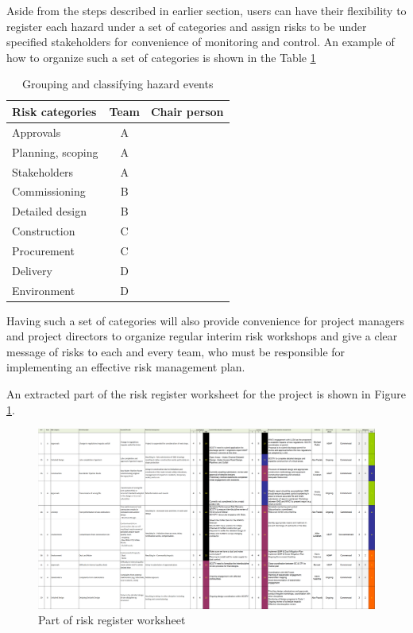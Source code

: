 \documentclass[10pt,halfline,a4paper]{ouparticle}
\begin{document}
Aside from the steps described in earlier section, users can have their flexibility to register each hazard under a set of categories and assign risks to be under specified stakeholders for convenience of monitoring and control. An example of how to organize such a set of categories is shown in the Table \ref{tbl_categories}
\begin{table}
	\centering
	\caption{Grouping and classifying hazard events}
	\begin{tabular}{l|l|l}
		\hline
		Risk categories & \multicolumn{1}{c|}{Team} & Chair person \\ 
		\hline
		Approvals & \multicolumn{1}{c|}{A} &  \\ 
		Planning, scoping & \multicolumn{1}{c|}{A} &  \\ 
		Stakeholders & \multicolumn{1}{c|}{A} &  \\ 
		Commissioning & \multicolumn{1}{c|}{B} &  \\ 
		Detailed design & \multicolumn{1}{c|}{B} &  \\ 
		Construction & \multicolumn{1}{c|}{C} &  \\ 
		Procurement & \multicolumn{1}{c|}{C} &  \\ 
		Delivery & \multicolumn{1}{c|}{D} &  \\ 
		Environment & \multicolumn{1}{c|}{D} &  \\ 
		\hline
	\end{tabular}
	\label{tbl_categories}
\end{table}

Having such a set of categories will also provide convenience for project managers and project directors to organize regular interim risk workshops and give a clear message of risks to each and every team, who must be responsible for implementing an effective risk management plan.

An extracted part of the risk register worksheet for the project is shown in Figure \ref{fig_riskregister}.


\begin{figure}
	\centering \includegraphics[scale=0.2]{riskregister} \caption{Part of risk register worksheet}
	\label{fig_riskregister} 
\end{figure}
\end{document}
